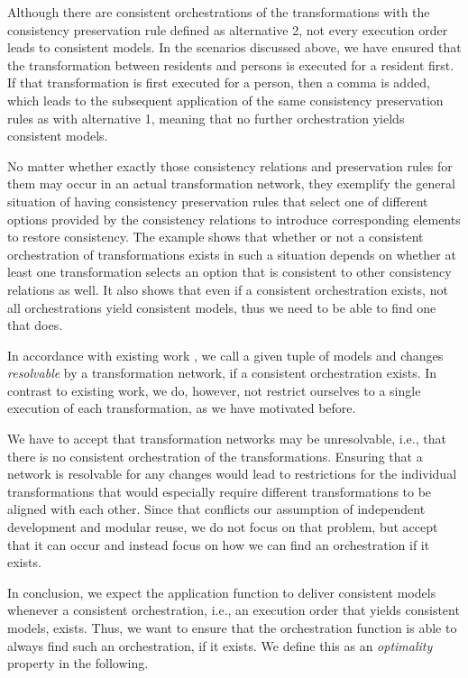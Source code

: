 Although there are consistent orchestrations of the transformations with the consistency preservation rule defined as alternative 2, not every execution order leads to consistent models.
In the scenarios discussed above, we have ensured that the transformation between residents and persons is executed for a resident first.
If that transformation is first executed for a person, then a comma is added, which leads to the subsequent application of the same consistency preservation rules as with alternative 1, meaning that no further orchestration yields consistent models.

No matter whether exactly those consistency relations and preservation rules for them may occur in an actual transformation network, they exemplify the general situation of having consistency preservation rules that select one of different options provided by the consistency relations to introduce corresponding elements to restore consistency.
The example shows that whether or not a consistent orchestration of transformations exists in such a situation depends on whether at least one transformation selects an option that is consistent to other consistency relations as well.
It also shows that even if a consistent orchestration exists, not all orchestrations yield consistent models, thus we need to be able to find one that does.

In accordance with existing work \cite{stevens2020BidirectionalTransformationLarge-SoSym}, we call a given tuple of models and changes \emph{resolvable} by a transformation network, if a consistent orchestration exists.
In contrast to existing work, we do, however, not restrict ourselves to a single execution of each transformation, as we have motivated before.

We have to accept that transformation networks may be unresolvable, i.e., that there is no consistent orchestration of the transformations.
Ensuring that a network is resolvable for any changes would lead to restrictions for the individual transformations that would especially require different transformations to be aligned with each other.
Since that conflicts our assumption of independent development and modular reuse, we do not focus on that problem, but accept that it can occur and instead focus on how we can find an orchestration if it exists. 

In conclusion, we expect the application function to deliver consistent models whenever a consistent orchestration, i.e., an execution order that yields consistent models, exists.
Thus, we want to ensure that the orchestration function is able to always find such an orchestration, if it exists.
We define this as an \emph{optimality} property in the following.

